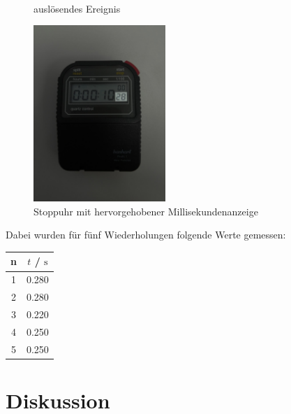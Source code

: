 \documentclass[a4paper,12pt]{article}
\begin{document}
\begin{multicols}{3}
\begin{figure}[H]
        \caption{\\auslösendes Ereignis}
        \label{Abb:ZusatzversuchBild2}
    \end{figure}
    \columnbreak
    \begin{figure}[H]
        \centering
        \includegraphics[width=5cm]{bilder/Zusatzversuch_3_export.jpg}
        \caption{Stoppuhr mit hervorgehobener Millisekundenanzeige}
        \label{Abb:ZusatzversuchBild3}
    \end{figure}
    \columnbreak
\end{multicols}

Dabei wurden für fünf Wiederholungen folgende Werte gemessen:

\begin{table}[H]
    \centering
    \begin{tabular}{|c|c|}
        \hline
        n & $t$ / $\mathrm{s}$ \\
        \hline
        1 & 0.280 \\
        2 & 0.280 \\
        3 & 0.220 \\
        4 & 0.250 \\
        5 & 0.250 \\
        \hline
    \end{tabular}
\end{table}


\section{Diskussion}
\end{document}
